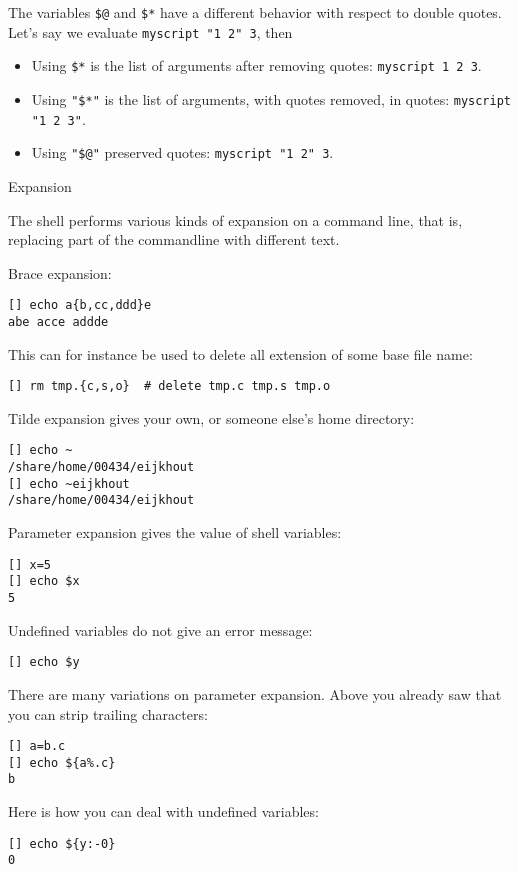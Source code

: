 The variables \verb+$@+ and \verb+$*+ have a different behavior with
respect to double quotes. Let's say we evaluate
\verb+myscript "1 2" 3+, then
\begin{itemize}
\item Using \verb+$*+ is the list of arguments after removing quotes:
  \verb+myscript 1 2 3+.
\item Using
  \verb+"$*"+ is the list of arguments, with quotes removed, in quotes:
  \verb+myscript "1 2 3"+.
\item Using
  \verb+"$@"+ preserved quotes:
  \verb+myscript "1 2" 3+.
\end{itemize}

 {Expansion}
\label{tut:unix-expansion}

The shell performs various kinds of expansion on a command line, that
is, replacing part of the commandline with different text.

Brace expansion:
\begin{verbatim}
[] echo a{b,cc,ddd}e
abe acce addde
\end{verbatim}
This can for instance be used to delete all extension of some base
file name:
\begin{verbatim}
[] rm tmp.{c,s,o}  # delete tmp.c tmp.s tmp.o
\end{verbatim}

Tilde expansion gives your own, or someone else's home directory:
\begin{verbatim}
[] echo ~
/share/home/00434/eijkhout
[] echo ~eijkhout
/share/home/00434/eijkhout
\end{verbatim}

Parameter expansion gives the value of shell variables:
\begin{verbatim}
[] x=5
[] echo $x
5
\end{verbatim}
Undefined variables do not give an error message:
\begin{verbatim}
[] echo $y
\end{verbatim}
There are many variations on parameter expansion. Above you already
saw that you can strip trailing characters:
\begin{verbatim}
[] a=b.c
[] echo ${a%.c}
b
\end{verbatim}
Here is how you can deal with undefined variables:
\begin{verbatim}
[] echo ${y:-0}
0
\end{verbatim}

\begin{comment}
There are ways of doing pattern matching and substitution 
on a variable:
\begin{verbatim}
[] f=x.fort
[] echo ${f%%.fort}
x
[] echo ${f%%.fort}.bak
x.bak
\end{verbatim}
\end{comment}

